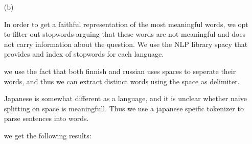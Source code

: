 \documentclass[11pt]{article}
\begin{document}
\begin{enumerate}
    \item[(b)] 

    In order to get a faithful representation of the most meaningful words, we opt to filter out stopwords arguing that these words are not meaningful and does not carry information about the question.
    We use the NLP library spacy that provides and index of stopwords for each language.

    we use the fact that both finnish and russian uses spaces to seperate their words, and thus we can extract distinct words using the space as delimiter.

    Japanese is somewhat different as a language, and it is unclear whether naive splitting on space is meaningfull. 
    Thus we use a japanese speific tokenizer to parse sentences into words.

    we get the following results:


\end{enumerate}
\end{document}

